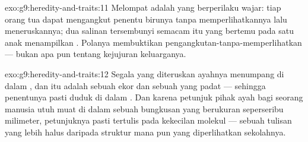 \begin{solution}{exo:g9:heredity-and-traits:11}
Melompat adalah  yang berperilaku wajar: tiap
orang tua dapat mengangkut penentu  birunya tanpa
memperlihatkannya lalu meneruskannya; dua salinan
tersembunyi semacam itu yang bertemu pada satu anak
menampilkan . Polanya membuktikan
pengangkutan-tanpa-memperlihatkan --- bukan apa pun tentang
kejujuran keluarganya.
\end{solution}

\begin{solution}{exo:g9:heredity-and-traits:12}
Segala yang diteruskan ayahnya menumpang di dalam , dan  itu adalah sebuah ekor dan sebuah
 yang padat --- sehingga penentunya pasti duduk di
dalam . Dan karena petunjuk pihak ayah bagi
seorang manusia utuh muat di dalam sebuah bungkusan yang
berukuran seperseribu milimeter, petunjuknya pasti tertulis
pada kekecilan molekul --- sebuah tulisan yang lebih halus
daripada struktur  mana pun yang diperlihatkan 
sekolahnya.
\end{solution}

